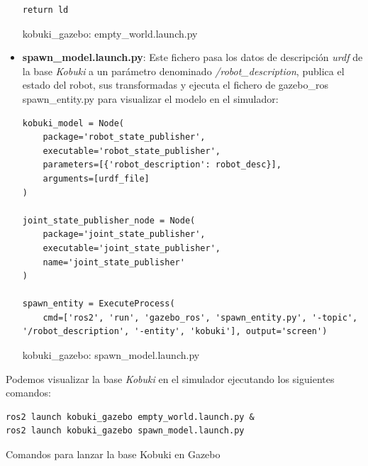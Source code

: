\begin{itemize}
\begin{code}[H]
\begin{lstlisting}[frame=single]
	return ld
\end{lstlisting}
\caption[kobuki\_gazebo: empty\_world.launch.py]{kobuki\_gazebo: empty\_world.launch.py}
\label{cod:kobuki_gazebo_empty_world}
\end{code}

	\item \textbf{spawn\_model.launch.py}: Este fichero pasa los datos de descripción \textit{urdf} de la base \textit{Kobuki} a un parámetro denominado \textit{/robot\_description}, publica el estado del robot, sus transformadas y ejecuta el fichero de gazebo\_ros spawn\_entity.py para visualizar el modelo en el simulador:
	
\begin{code}[H]
\begin{lstlisting}[frame=single]
kobuki_model = Node(
	package='robot_state_publisher',
	executable='robot_state_publisher',
	parameters=[{'robot_description': robot_desc}],
	arguments=[urdf_file]
)

joint_state_publisher_node = Node(
	package='joint_state_publisher',
	executable='joint_state_publisher',
	name='joint_state_publisher'
)

spawn_entity = ExecuteProcess(
	cmd=['ros2', 'run', 'gazebo_ros', 'spawn_entity.py', '-topic', '/robot_description', '-entity', 'kobuki'], output='screen')
\end{lstlisting}
\caption[kobuki\_gazebo: spawn\_model.launch.py]{kobuki\_gazebo: spawn\_model.launch.py}
\label{cod:kobuki_gazebo_spawn_model}
\end{code}
\end{itemize}

Podemos visualizar la base \textit{Kobuki} en el simulador ejecutando los siguientes comandos:\\

\begin{code}[H]
\begin{lstlisting}
ros2 launch kobuki_gazebo empty_world.launch.py &
ros2 launch kobuki_gazebo spawn_model.launch.py
\end{lstlisting}
\caption{Comandos para lanzar la base Kobuki en Gazebo}
\label{cod:comandos_kobuki_launch}
\end{code}\

